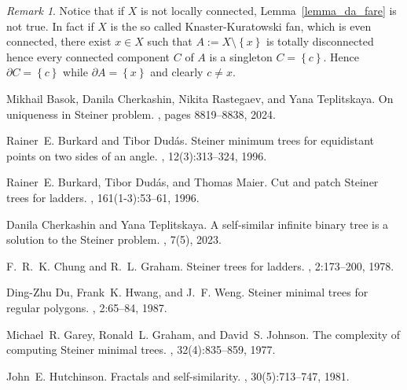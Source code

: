 \documentclass{amsart}
\newcommand{\ENCLOSE}[1]{\left\{#1\right\}}
\theoremstyle{definition}
\theoremstyle{remark}
\newtheorem{remark}[theorem]{Remark}
\begin{document}
\begin{remark}
Notice that if $X$ is not locally connected, Lemma~\ref{lemma_da_fare} is not true.
In fact if $X$ is the so called Knaster-Kuratowski fan, which is even connected, 
there exist $x\in X$ such that $A:= X\setminus\ENCLOSE{x}$ is totally disconnected hence
every connected component $C$ of $A$ is a singleton $C=\ENCLOSE{c}$.
Hence $\partial C = \ENCLOSE{c}$ while $\partial A = \ENCLOSE{x}$ and clearly $c\neq x$.
\end{remark}


%
\begin{thebibliography}{10}
  Mikhail Basok, Danila Cherkashin, Nikita Rastegaev, and Yana Teplitskaya.
  \newblock On uniqueness in {S}teiner problem.
  , pages 8819--8838, 2024.
  
  Rainer~E. Burkard and Tibor Dud{\'a}s.
  \newblock Steiner minimum trees for equidistant points on two sides of an angle.
  , 12(3):313--324, 1996.
  
  Rainer~E. Burkard, Tibor Dud{\'a}s, and Thomas Maier.
  \newblock Cut and patch {S}teiner trees for ladders.
  , 161(1-3):53--61, 1996.
  
  Danila Cherkashin and Yana Teplitskaya.
  \newblock A self-similar infinite binary tree is a solution to the {S}teiner problem.
  , 7(5), 2023.
  
  F.~R.~K. Chung and R.~L. Graham.
  \newblock Steiner trees for ladders.
  , 2:173--200, 1978.
  
  Ding-Zhu Du, Frank~K. Hwang, and J.~F. Weng.
  \newblock Steiner minimal trees for regular polygons.
  , 2:65--84, 1987.
  
  Michael~R. Garey, Ronald~L. Graham, and David~S. Johnson.
  \newblock The complexity of computing {S}teiner minimal trees.
  , 32(4):835--859, 1977.
  
  John~E. Hutchinson.
  \newblock Fractals and self-similarity.
  , 30(5):713--747, 1981.
  

\end{thebibliography}
\end{document}

